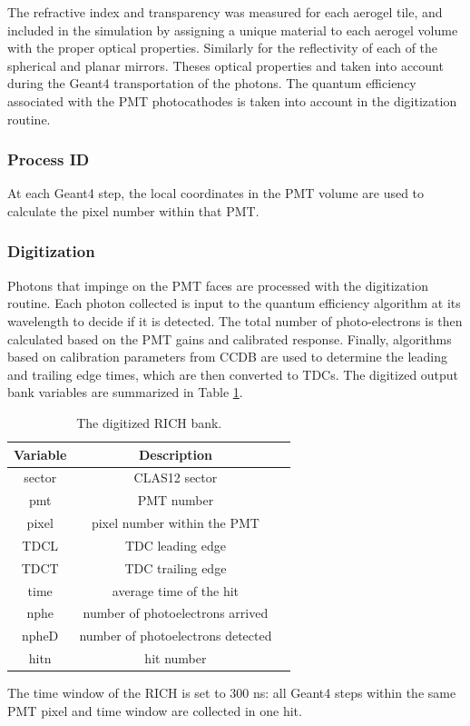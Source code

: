 The refractive index and transparency was measured for each aerogel tile, and included in the simulation by
assigning a unique material to each aerogel volume with the proper optical properties.
Similarly for the reflectivity of each of the spherical and planar mirrors.
Theses optical properties and taken into account during the Geant4 transportation of the photons.
The quantum efficiency associated with the PMT photocathodes is taken into account in the digitization routine.

\subsubsection{Process ID}
At each Geant4 step, the local coordinates in the PMT volume are used to calculate the pixel number within that PMT.

\subsubsection{Digitization}

Photons that impinge on the PMT faces are processed with the digitization routine.
Each photon collected is input to the quantum efficiency algorithm at its wavelength to decide if it is detected.
The total number of photo-electrons is then calculated based on the PMT gains and calibrated response.
Finally, algorithms based on calibration parameters from CCDB are used to determine the leading and trailing edge times, which are
then converted to TDCs.
The digitized output bank variables are summarized in Table \ref{tab:richBank}.

\begin{table}[h]
	\begin{center}
		\begin{tabular}{| c | c | c |}
			\hline \hline
			Variable & Description                                         \\
			\hline
             sector  &                                     CLAS12 sector   \\
                pmt  &                                        PMT number   \\
              pixel  &                       pixel number within the PMT   \\
               TDCL  &                                  TDC leading edge   \\
               TDCT  &                                 TDC trailing edge   \\
               time  &                           average time of the hit   \\
               nphe  &                  number of photoelectrons arrived   \\
              npheD  &                 number of photoelectrons detected   \\
               hitn  &                                        hit number   \\
			\hline \hline
		\end{tabular}
	\end{center}
	\caption{The digitized RICH bank.}\label{tab:richBank}
\end{table}

The time window  of the RICH is set to 300 ns: all Geant4 steps within the same PMT pixel and time window are collected in one hit.
